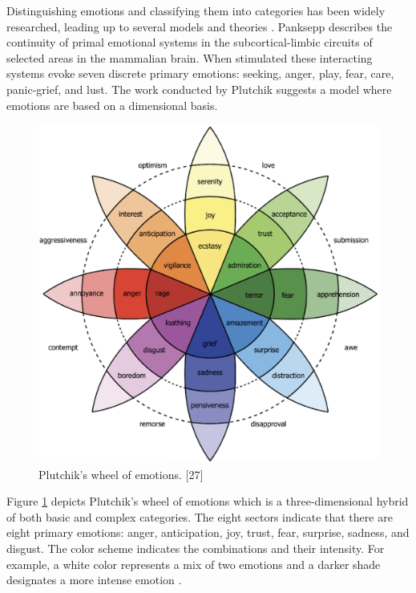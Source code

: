 Distinguishing emotions and classifying them into categories has been widely researched, leading up to several models and theories  \cite{cross_cultural} \cite{HP_RPP} \cite{HP_Advanced}. Panksepp \cite{panksepp_book} describes the continuity of primal emotional systems in the subcortical-limbic circuits of selected areas in the mammalian brain. When stimulated these interacting systems evoke seven discrete primary emotions: seeking, anger, play, fear, care, panic-grief, and lust. The work conducted by Plutchik \cite{plutchik_model} suggests a model where emotions are based on a dimensional basis. 
%
\begin{figure}[h]
  \centering
  \includegraphics[width=\textwidth]{figures/plutchiks_model.png}
  \caption{Plutchik's wheel of emotions. [27]}
  \label{fig:plutchik}
\end{figure}
%
Figure \ref{fig:plutchik} depicts Plutchik's wheel of emotions which is a three-dimensional hybrid of both basic and complex categories. The eight sectors indicate that there are eight primary emotions: anger, anticipation, joy, trust, fear, surprise, sadness, and disgust. The color scheme indicates the combinations and their intensity. For example, a white color represents a mix of two emotions and a darker shade designates a more intense emotion \cite{HP_RPP} \cite{HP_Advanced}. \\

